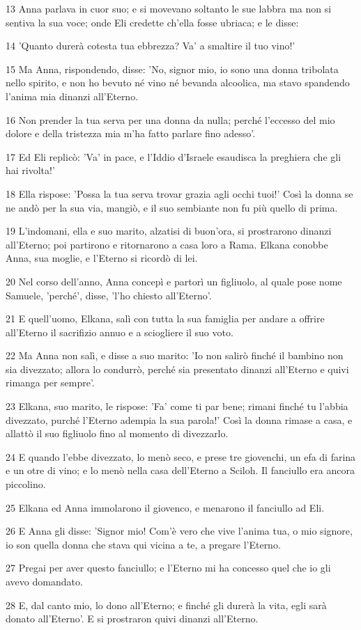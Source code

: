 \par 13 Anna parlava in cuor suo; e si movevano soltanto le sue labbra ma non si sentiva la sua voce; onde Eli credette ch'ella fosse ubriaca; e le disse:
\par 14 'Quanto durerà cotesta tua ebbrezza? Va' a smaltire il tuo vino!'
\par 15 Ma Anna, rispondendo, disse: 'No, signor mio, io sono una donna tribolata nello spirito, e non ho bevuto né vino né bevanda alcoolica, ma stavo spandendo l'anima mia dinanzi all'Eterno.
\par 16 Non prender la tua serva per una donna da nulla; perché l'eccesso del mio dolore e della tristezza mia m'ha fatto parlare fino adesso'.
\par 17 Ed Eli replicò: 'Va' in pace, e l'Iddio d'Israele esaudisca la preghiera che gli hai rivolta!'
\par 18 Ella rispose: 'Possa la tua serva trovar grazia agli occhi tuoi!' Così la donna se ne andò per la sua via, mangiò, e il suo sembiante non fu più quello di prima.
\par 19 L'indomani, ella e suo marito, alzatisi di buon'ora, si prostrarono dinanzi all'Eterno; poi partirono e ritornarono a casa loro a Rama. Elkana conobbe Anna, sua moglie, e l'Eterno si ricordò di lei.
\par 20 Nel corso dell'anno, Anna concepì e partorì un figliuolo, al quale pose nome Samuele, 'perché', disse, 'l'ho chiesto all'Eterno'.
\par 21 E quell'uomo, Elkana, salì con tutta la sua famiglia per andare a offrire all'Eterno il sacrifizio annuo e a sciogliere il suo voto.
\par 22 Ma Anna non salì, e disse a suo marito: 'Io non salirò finché il bambino non sia divezzato; allora lo condurrò, perché sia presentato dinanzi all'Eterno e quivi rimanga per sempre'.
\par 23 Elkana, suo marito, le rispose: 'Fa' come ti par bene; rimani finché tu l'abbia divezzato, purché l'Eterno adempia la sua parola!' Così la donna rimase a casa, e allattò il suo figliuolo fino al momento di divezzarlo.
\par 24 E quando l'ebbe divezzato, lo menò seco, e prese tre giovenchi, un efa di farina e un otre di vino; e lo menò nella casa dell'Eterno a Sciloh. Il fanciullo era ancora piccolino.
\par 25 Elkana ed Anna immolarono il giovenco, e menarono il fanciullo ad Eli.
\par 26 E Anna gli disse: 'Signor mio! Com'è vero che vive l'anima tua, o mio signore, io son quella donna che stava qui vicina a te, a pregare l'Eterno.
\par 27 Pregai per aver questo fanciullo; e l'Eterno mi ha concesso quel che io gli avevo domandato.
\par 28 E, dal canto mio, lo dono all'Eterno; e finché gli durerà la vita, egli sarà donato all'Eterno'. E si prostraron quivi dinanzi all'Eterno.

